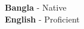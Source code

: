 
\vspace{2mm}

  \textbf{Bangla} - Native \\
  \vspace{1mm}
  \textbf{English} - Proficient \\
\vspace{5mm}